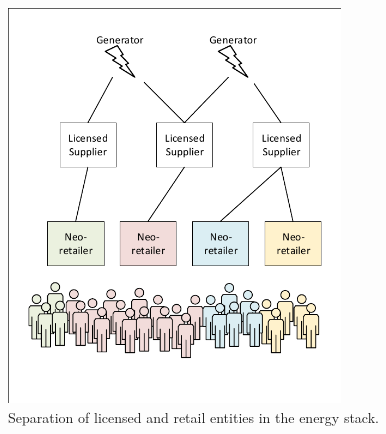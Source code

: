 \documentclass[a4paper,12pt,reqno]{amsart}
\theoremstyle{definition}
\begin{document}
\begin{figure}[h!]
% 
% 
% 
\begin{center}
\includegraphics[width=250pt]{enosi-stack}
\caption{Separation of licensed and retail entities in the energy stack.}\label{fig2}
\end{center}
\end{figure}
\end{document}
